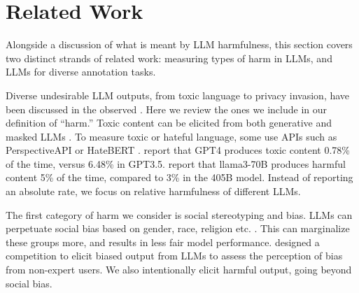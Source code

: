 \section{Related Work}
Alongside a discussion of what is meant by LLM harmfulness,
this section covers two distinct strands of related work: measuring types of harm in LLMs, and LLMs for diverse annotation tasks. %

Diverse undesirable LLM outputs, from toxic language to privacy invasion, have been discussed in the observed \cite{banko-etal-2020-unified}. Here we review the ones we include in our definition of ``harm.'' %
Toxic content can be elicited from both generative  \cite{deshpande2023toxicity} and masked LLMs \cite{ousidhoum-etal-2021-probing}. 
To measure toxic or hateful language, some use APIs such as PerspectiveAPI \cite{lees2022new} or HateBERT \cite{caselli-etal-2021-hatebert}. \citet{openai2024gpt4technicalreport} report that GPT4 produces toxic content 0.78\% of the time, versus 6.48\% in GPT3.5.
\citet{dubey2024llama} report that llama3-70B produces harmful content 5\% of the time, %
compared to 3\% in the 405B model.
Instead of %
reporting an absolute rate, we focus on relative harmfulness of different LLMs. %

The first category of harm we consider is social stereotyping and bias. %
LLMs can perpetuate social bias based on gender, race, religion etc. \cite{lin-etal-2022-gendered,bender2021dangers,field-etal-2021-survey,gupta-etal-2024-sociodemographic,andriushchenko2024agentharm,mazeika2024harmbench}. This can marginalize these groups more, and results in less fair model performance. \citet{guo2024hey} designed a competition to elicit biased output from LLMs to assess the perception of bias from non-expert users. %
We also intentionally elicit harmful output, going %
beyond social bias.


